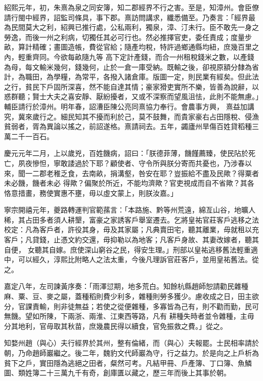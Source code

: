 \begin{pinyinscope}
 紹熙元年，初，朱熹為泉之同安簿，知二郡經界不行之害。至是，知漳州。會臣僚請行閩中經界，詔監司條具，事下郡。熹訪問講求，纖悉備至。乃奏言：「經界最為民間莫大之利，紹興已推行處，公私兩利，獨泉，漳、汀未行。臣不敢先一身之勞逸，而後一州之利病，切獨任其必可行也。然必推擇官吏，委任責成；度量步畝，算計精確；畫圖造帳，費從官給；隨產均稅，特許過鄉通縣均紐，庶幾百里之內，輕重齊同。今欲每畝隨九等
 高下定計產錢，而合一州租稅錢米之數，以產錢為母，每文輸米幾何，錢幾何，止於一倉一庫受納。既輸之後，卻視原額分隸為省計，為職田，為學糧，為常平，各撥入諸倉庫。版圖一定，則民業有經矣。但此法之行，貧民下戶固所深喜，然不能自達其情；豪家猾吏實所不樂，皆善為說辭，以惑群聽；賢士大夫之喜安靜、厭紛擾者，又或不深察而望風沮怯，此則不能無慮。」輔臣請行於漳州。明年春，詔漕臣陳公亮同熹協力奉行。會農事方興，
 熹益加講究，冀來歲行之。細民知其不擾而利於己，莫不鼓舞，而貴家豪右占田隱稅、侵漁貧弱者，胥為異論以搖之，前詔遂格。熹請祠去。五年，蠲廬州旱傷百姓貸稻種三萬二千一百石。



 慶元元年二月，上以歲兇，百姓饑病，詔曰：「朕德菲薄，饑饉薦臻，使民阽於死亡，夙夜慘怛，寧敢諉過於下耶？顧使者、守令所與朕分寄而共憂也，乃涉春以來，聞一二郡老稚乏食，去南畝，捐溝壑，咎安在耶？豈振給不盡及民歟？得粟者未必饑，饑者未必
 得歟？偏聚於所近，不能均濟歟？官吏視成而自不省歟？其各恪意措畫，務使實惠不壅，毋以虛文蒙上，則朕汝嘉。」



 寧宗開禧元年，夔路轉運判官範蓀言：「本路施、黔等州荒遠，綿亙山谷，地曠人稀，其占田多者須人耕墾，富豪之家誘客戶舉室遷去。乞將皇祐官莊客戶逃移之法校定：凡為客戶者，許役其身，毋及其家屬；凡典賣田宅，聽其離業，毋就租以充客戶；凡貸錢，止憑文約交還，毋抑勒以為地客；凡客戶身故、其妻改嫁者，聽其自便，
 女聽其自嫁。庶使深山窮谷之民，得安生理。」刑部以皇祐逃移舊法輕重適中，可以經久，淳熙比附略人之法太重，今後凡理訴官莊客戶，並用皇祐舊法。從之。



 嘉定八年，左司諫黃序奏：「雨澤愆期，地多荒白。知餘杭縣趙師恕請勸民雜種麻、粟、豆、麥之屬，蓋種稻則費少利多，雜種則勞多獲少。慮收成之日，田主欲分，官課責輸，則非徒無益；若使之從便雜種，多寡皆為己有，則不勸而勤，民可無饑。望如所陳，下兩浙、兩淮、江東西等路，凡有
 耕種失時者並令雜種，主毋分其地利，官毋取其秋苗，庶幾農民得以續食，官免振救之費。」從之。



 知婺州趙（與心）夫行經界於其州，整有倫緒，而（與心）夫報罷。士民相率請於朝，乃命趙師巖繼之。後二年，魏豹文代師巖為守，行之益力。於是向之上戶析為貧下之戶，實田隱為逃絕之田者，粲然可考。凡結甲冊、戶產簿、丁口簿、魚鱗圖、類姓簿二十三萬九千有奇，創庫匱以藏之，歷三年而後上其事於朝。




\end{pinyinscope}
